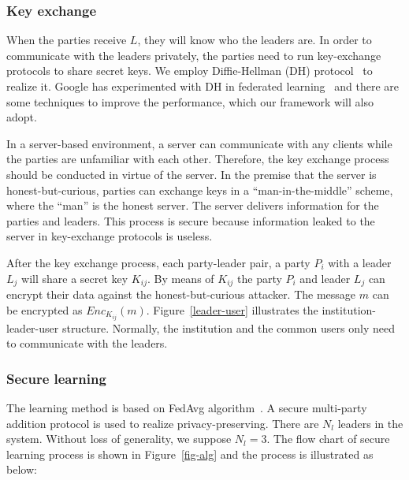 \subsubsection{\textbf{Key exchange}}
When the parties receive $L$, they will know who the leaders are. In order to communicate with the leaders privately, the parties need to run key-exchange protocols to share secret keys. We employ Diffie-Hellman (DH) protocol~\cite{DH} to realize it. Google has experimented with DH in federated learning~\cite{Practical} and there are some techniques to improve the performance, which our framework will also adopt.

In a server-based environment, a server can communicate with any clients while the parties are unfamiliar with each other. Therefore, the key exchange process should be conducted in virtue of the server. In the premise that the server is honest-but-curious, parties can exchange keys in a ``man-in-the-middle'' scheme, where the ``man'' is the honest server. The server delivers information for the parties and leaders. This process is secure because information leaked to the server in key-exchange protocols is useless.

After the key exchange process, each party-leader pair, a party $P_i$ with a leader $L_j$ will share a secret key $K_{ij}$. By means of $K_{ij}$ the party $P_i$ and leader $L_j$ can encrypt their data against the honest-but-curious attacker. The message $m$ can be encrypted as $Enc_{K_{ij}}(m)$. Figure~\ref{leader-user} illustrates the institution-leader-user structure. Normally, the institution and the common users only need to communicate with the leaders.

\subsubsection{\textbf{Secure learning}}
The learning method is based on FedAvg algorithm~\cite{mcmahan2016communicationefficient}. A secure multi-party addition protocol is used to realize privacy-preserving. There are $N_l$ leaders in the system. Without loss of generality, we suppose $N_l = 3$. The flow chart of secure learning process is shown in Figure~\ref{fig-alg} and the process is illustrated as below:

